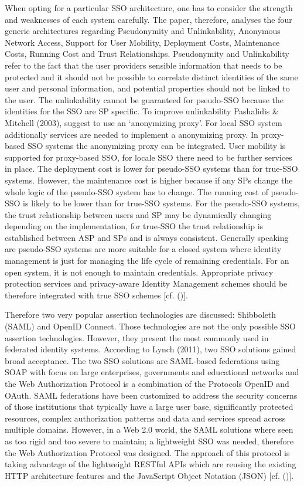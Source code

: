 {{		When opting for a particular SSO architecture, one has to consider the strength and weaknesses of each system carefully. The paper, therefore, analyses the four generic architectures regarding Pseudonymity and Unlinkability, Anonymous Network Access, Support for User Mobility, Deployment Costs, Maintenance Costs, Running Cost and Trust Relationships. Pseudonymity and Unlinkability refer to the fact that the user providers sensible information that needs to be protected and it should not be possible to correlate distinct identities of the same user and personal information, and potential properties should not be linked to the user. The unlinkability cannot be guaranteed for pseudo-SSO because the identities for the SSO are SP specific. To improve unlinkability   Pashalidis \& Mitchell (2003), suggest to use an ‘anonymizing proxy’. For local SSO system additionally services are needed to implement a anonymizing proxy. In proxy-based SSO systems the anonymizing proxy can be integrated. User mobility is supported for proxy-based SSO, for locale SSO there need to be further services in place. The deployment cost is lower for pseudo-SSO systems than for true-SSO systems. However, the maintenance cost is higher because if any SPs change the whole logic of the pseudo-SSO system has to change. The running cost of pseudo-SSO is likely to be lower than for true-SSO systems. For the pseudo-SSO systems, the trust relationship between users and SP may be dynamically changing depending on the implementation, for true-SSO the trust relationship is established between ASP and SPs and is always consistent. Generally speaking are pseudo-SSO systems are more suitable for a closed system where identity management is just for managing the life cycle of remaining credentials. For an open system, it is not enough to maintain credentials. Appropriate privacy protection services and privacy-aware Identity Management schemes should be therefore integrated with true SSO schemes [cf. (\cite{Pashalidis:2003:10.1007/3-540-45067-X_22})]. 
			
		Therefore two very popular assertion technologies are discussed: Shibboleth (SAML) and OpenID Connect. Those technologies are not the only possible SSO assertion technologies. However, they present the most commonly used in federated identity systems. According to Lynch (2011), two SSO solutions gained broad acceptance. The two SSO solutions are SAML-based federations using SOAP with focus on large enterprises, governments and educational networks and the Web Authorization Protocol is a combination of the Protocols OpenID and OAuth. SAML federations have been customized to address the security concerns of those institutions that typically have a large user base, significantly protected resources, complex authorization patterns and data and services spread across multiple domains. However, in a Web 2.0 world, the SAML solutions where seen as too rigid and too severe to maintain; a lightweight SSO was needed, therefore the Web Authorization Protocol was designed. The approach of this protocol is taking advantage of the lightweight RESTful APIs which are reusing the existing HTTP architecture features and the JavaScript Object Notation (JSON) [cf. (\cite{Lynch:2017:IIG})].
			
}}

